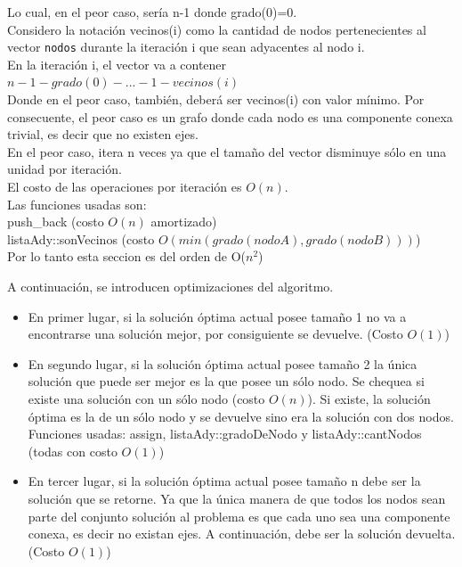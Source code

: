 Lo cual, en el peor caso, ser\'ia n-1 donde grado(0)=0.\\

Considero la notaci\'on vecinos(i) como la cantidad de nodos pertenecientes al vector \texttt{nodos} durante la iteraci\'on i que sean adyacentes al nodo i.\\

En la iteraci\'on i, el vector va a contener $n-1-grado(0)- ... -1-vecinos(i)$\\

Donde en el peor caso, tambi\'en, deber\'a ser vecinos(i) con valor m\'inimo. Por consecuente, el peor caso es un grafo donde cada nodo es una componente conexa trivial, es decir que no existen ejes.\\
	
En el peor caso, itera n veces ya que el tama\~no del vector disminuye s\'olo en una unidad por iteraci\'on.\\

El costo de las operaciones por iteraci\'on es $O(n)$.\\

Las funciones usadas son:\\

push_back (costo $O(n)$ amortizado)\\

listaAdy::sonVecinos (costo $O(min(grado(nodoA), grado(nodoB)))$)\\

Por lo tanto esta seccion es del orden de O($n^2$)

\bigskip

A continuaci\'on, se introducen optimizaciones del algoritmo.

\begin{itemize}
\item En primer lugar, si la soluci\'on \'optima actual posee tama\~no 1 no va a encontrarse una soluci\'on mejor, por consiguiente se devuelve. (Costo $O(1)$)
\item En segundo lugar, si la soluci\'on \'optima actual posee tama\~no 2 la \'unica soluci\'on que puede ser mejor es la que posee un s\'olo nodo. Se chequea si existe una soluci\'on con un s\'olo nodo (costo $O(n)$). Si existe, la soluci\'on \'optima es la de un s\'olo nodo y se devuelve sino era la soluci\'on con dos nodos. Funciones usadas: assign, listaAdy::gradoDeNodo y listaAdy::cantNodos (todas con costo $O(1)$)
\item En tercer lugar, si la soluci\'on \'optima actual posee tama\~no n debe ser la soluci\'on que se retorne. Ya que la \'unica manera de que todos los nodos sean parte del conjunto soluci\'on al problema es que cada uno sea una componente conexa, es decir no existan ejes. A continuaci\'on, debe ser la soluci\'on devuelta. (Costo $O(1)$)
\end{itemize}

